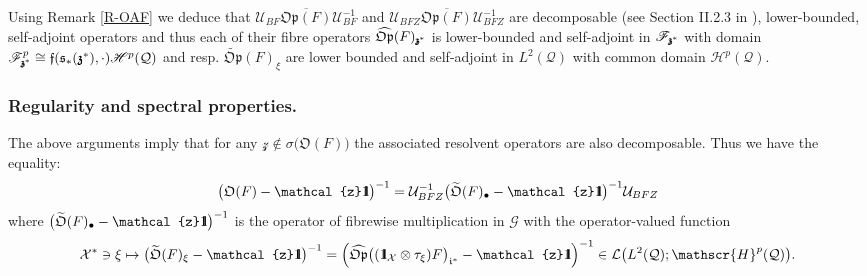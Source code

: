 \documentclass[12pt]{article}
\theoremstyle{definition}
\def\Op{\mathfrak{Op}}
\def\X{\mathcal X}
\def\U{\mathcal{U}}
\def\T{\mathcal{Q}}
\def\bb1{{\rm{1}\hspace{-3pt}\mathbf{l}}}
\def\s{\mathfrak{s}}
\def\bz{\mathfrak{z}\hspace*{-4pt}\mathfrak{z}}
\def\zz{\mathcal{z}}
\def\beq{\begin{equation}}
\def\eeq{\end{equation}}
\def\mO{\mathfrak{O}}
\numberwithin{equation}{section}
\begin{document}
Using Remark \ref{R-OAF} we deduce that $\U_{BF}\overline{\Op(F)}\U_{BF}^{-1}$ and $\U_{BFZ}\overline{\Op(F)}\U_{BFZ}^{-1}$ are decomposable  (see Section II.2.3 in \cite{Dix}), lower-bounded, self-adjoint operators and thus each of their fibre operators $\widehat{\Op}(F)_{\bz^*}$ is lower-bounded and self-adjoint in $\mathscr{F}_{\bz^*}$ with domain $ \mathscr{F}^p_{\bz^*}\cong\mathfrak{f}(\s_*(\bz^*),\cdot)\mathscr{H}^p(\T)$ and resp. $\widetilde{\Op}(F)_{\xi}$ are lower bounded and self-adjoint in $L^2(\T)$ with common domain $\mathscr{H}^p(\T)$. 

\subsubsection{Regularity and spectral properties.}\label{SSS-reg}
The above arguments imply that for any $\zz\notin\sigma\big(\mO(F)\big)$ the associated resolvent operators are also decomposable. Thus we have the equality:
\beq
\big(\mO(F)-\zz\bb1\big)^{-1}=\U_{BFZ}^{-1}\big(\widetilde{\mO}(F)_{\bullet}-\zz\bb1\big)^{-1}\U_{BFZ}
\eeq
where $\big(\widetilde{\mO}(F)_{\bullet}-\zz\bb1\big)^{-1}$ is the operator of fibrewise multiplication in $\mathscr{G}$ with the operator-valued function 
\beq\label{DF-Rez-xi}
\X^*\ni\xi\mapsto\big(\widetilde{\mO}(F)_{\xi}-\zz\bb1\big)^{-1}=\Big(\widehat{\Op}\big((\bb1_{\X}\otimes\tau_{\xi})F\big)_{\mathfrak{i}^*}-\zz\bb1\Big)^{-1}\in\mathcal{L}\big(L^2(\T);\mathscr{H}^p(\T)\big).
\eeq
\end{document}
